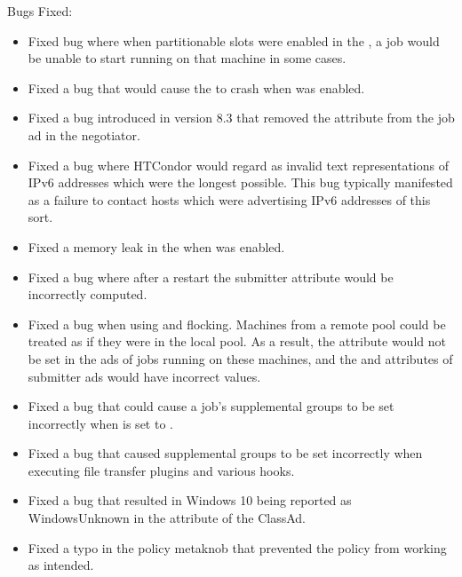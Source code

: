 \noindent Bugs Fixed:

\begin{itemize}

\item Fixed bug where when partitionable slots were
enabled in the , a job would be unable
to start running on that machine in some cases.

\item Fixed a bug that would cause the 
to crash when  was enabled.

\item Fixed a bug introduced in version 8.3 that
removed the attribute 
from the job ad in the negotiator.

\item Fixed a bug where HTCondor would regard as invalid text representations
of IPv6 addresses which were the longest possible.  This bug typically
manifested as a failure to contact hosts which were advertising IPv6 addresses
of this sort.

\item Fixed a memory leak in the  when
 was enabled.

\item Fixed a bug where after a  restart
the submitter attribute 
would be incorrectly computed.

\item Fixed a bug when using 
and flocking.
Machines from a remote pool could be treated as if they were in the local
pool.
As a result, the  attribute would not be set in the ads
of jobs running on these machines, and the  and
 attributes of submitter ads would have incorrect
values.

\item Fixed a bug that could cause a job's supplemental groups to be set
incorrectly when  is set to .

\item Fixed a bug that caused supplemental groups to be set incorrectly
when executing file transfer plugins and various hooks.

\item Fixed a bug that resulted in Windows 10 being reported as
WindowsUnknown in the  attribute of the 
ClassAd.

\item Fixed a typo in the  policy metaknob
that prevented the policy from working as intended.

\end{itemize}

